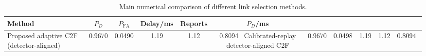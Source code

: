 \begin{table}[t]
    \centering
    \caption{Main numerical comparison of different link selection methods.}
    \label{tab:main_summary}
    \begin{tabular}{l c c c c c}
        \hline
        Method & $P_D$ & $P_{\mathrm{FA}}$ & Delay/ms & Reports & $P_D$/ms \\
        \hline
        Proposed adaptive C2F (detector-aligned) & 0.9670 & 0.0490 & 1.19 & 1.12 & 0.8094 \
        Calibrated-replay detector-aligned C2F & 0.9670 & 0.0498 & 1.19 & 1.12 & 0.8094 \
        \hline
    \end{tabular}
\end{table}
